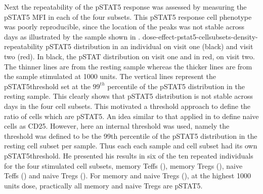 Next the repeatability of the pSTAT5 response was assessed by measuring the pSTAT5 \gls{MFI} in each of the four subsets.
This pSTAT5 response cell phenotype was poorly reproducible, since the location of the peaks was not stable across days as illustrated by the sample shown in .
{dose-effect-pstat5-cellsubsets-density-repeatability}
{ pSTAT5 distribution in an individual on visit one (black) and visit two (red).
}
{
In black, the pSTAT distribution on visit one and in red, on visit two.
The thinner lines are from the resting sample whereas the thicker lines are from the sample stimulated at 1000 units.
The vertical lines represent the pSTAT5\positive threshold set at the $99^{th}$ percentile of the pSTAT5 distribution in the resting sample.
This clearly shows that pSTAT5 distribution is not stable across days in the four cell subsets.
}
This motivated a threshold approach to define the ratio of cells which are pSTAT5\positive.
An idea similar to that applied in  to define naive cells as CD25\positive.
However, here an internal threshold was used, namely
the threshold was defined to be the 99th percentile of the pSTAT5 distribution in the resting cell subset per sample.
Thus each each sample and cell subset had its own pSTAT5\positive threshold.
He presented his results in six of the ten repeated individuals for the four stimulated cell subsets,
memory Teffs (),
memory Tregs (),
naive Teffs ()
and naive Tregs ().
For memory and naive Tregs (), at the highest 1000 units dose,
practically all memory and naive Tregs are pSTAT5\positive.
